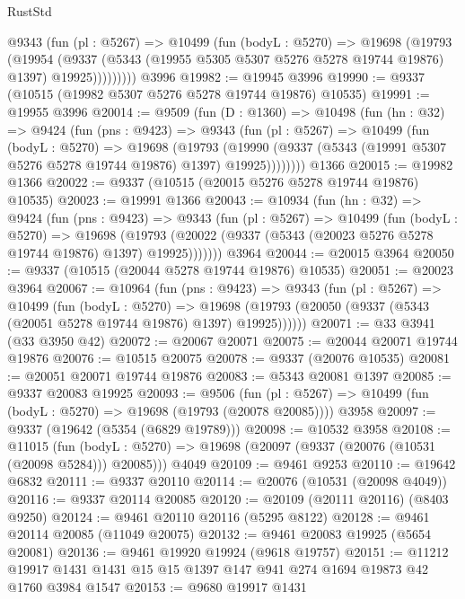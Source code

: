 \begin{lexlean}{RustStd}
\begin{coremodule}
          @9343
            (fun (pl : @5267) =>
            @10499
              (fun (bodyL : @5270) =>
              @19698
                (@19793
                  (@19954
                    (@9337
                      (@5343 (@19955 @5305 @5307 @5276 @5278 @19744 @19876) @1397)
                      @19925)))))))))
    @3996
@19982 := @19945 @3996
@19990 := @9337 (@10515 (@19982 @5307 @5276 @5278 @19744 @19876) @10535)
@19991 := @19955 @3996
@20014 := @9509
    (fun (D : @1360) =>
    @10498
      (fun (hn : @32) =>
      @9424
        (fun (pns : @9423) =>
        @9343
          (fun (pl : @5267) =>
          @10499
            (fun (bodyL : @5270) =>
            @19698
              (@19793
                (@19990 (@9337 (@5343 (@19991 @5307 @5276 @5278 @19744 @19876) @1397) @19925))))))))
    @1366
@20015 := @19982 @1366
@20022 := @9337 (@10515 (@20015 @5276 @5278 @19744 @19876) @10535)
@20023 := @19991 @1366
@20043 := @10934
    (fun (hn : @32) =>
    @9424
      (fun (pns : @9423) =>
      @9343
        (fun (pl : @5267) =>
        @10499
          (fun (bodyL : @5270) =>
          @19698
            (@19793 (@20022 (@9337 (@5343 (@20023 @5276 @5278 @19744 @19876) @1397) @19925)))))))
    @3964
@20044 := @20015 @3964
@20050 := @9337 (@10515 (@20044 @5278 @19744 @19876) @10535)
@20051 := @20023 @3964
@20067 := @10964
    (fun (pns : @9423) =>
    @9343
      (fun (pl : @5267) =>
      @10499
        (fun (bodyL : @5270) =>
        @19698 (@19793 (@20050 (@9337 (@5343 (@20051 @5278 @19744 @19876) @1397) @19925))))))
@20071 := @33 @3941 (@33 @3950 @42)
@20072 := @20067 @20071
@20075 := @20044 @20071 @19744 @19876
@20076 := @10515 @20075
@20078 := @9337 (@20076 @10535)
@20081 := @20051 @20071 @19744 @19876
@20083 := @5343 @20081 @1397
@20085 := @9337 @20083 @19925
@20093 := @9506
    (fun (pl : @5267) => @10499 (fun (bodyL : @5270) => @19698 (@19793 (@20078 @20085))))
    @3958
@20097 := @9337 (@19642 (@5354 (@6829 @19789)))
@20098 := @10532 @3958
@20108 := @11015
    (fun (bodyL : @5270) => @19698 (@20097 (@9337 (@20076 (@10531 (@20098 @5284))) @20085)))
    @4049
@20109 := @9461 @9253
@20110 := @19642 @6832
@20111 := @9337 @20110
@20114 := @20076 (@10531 (@20098 @4049))
@20116 := @9337 @20114 @20085
@20120 := @20109 (@20111 @20116) (@8403 @9250)
@20124 := @9461 @20110 @20116 (@5295 @8122)
@20128 := @9461 @20114 @20085 (@11049 @20075)
@20132 := @9461 @20083 @19925 (@5654 @20081)
@20136 := @9461 @19920 @19924 (@9618 @19757)
@20151 := @11212 @19917 @1431 @1431 @15 @15 @1397 @147 @941 @274 @1694 @19873 @42 @1760 @3984 @1547
@20153 := @9680 @19917 @1431

\end{coremodule}
\end{lexlean}
